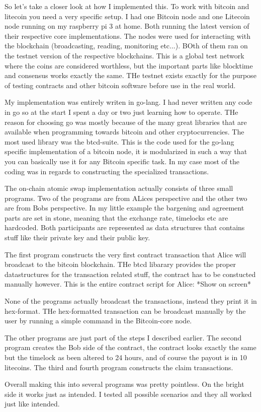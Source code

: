 So let's take a closer look at how I implemented this. To work with bitcoin and litecoin you
need a very specific setup. I had one Bitcoin node and one Litecoin node running on my raspberry pi 3
at home. Both running the latest version of their respective core implementations. The nodes were used 
for interacting with the blockchain (broadcasting, reading, monitoring etc...). 
BOth of them ran on the testnet version of the respective blockchains.
This is a global test network where the coins are considered worthless,
but the important parts like blocktime and consensus works exactly the same.
THe testnet exists exactly for the purpose of testing contracts and other bitcoin software
before use in the real world.

My implementation was entirely writen in go-lang. I had never written any code in go
so at the start I spent a day or two just learning how to operate. THe reason 
for choosing go was mostly because of the many great libraries that are available
when programming towards bitcoin and other cryptocurrencies. The most used
library was the btcd-suite. This is the code used for the go-lang specific implementation
of a bitcoin node, it is modularized in such a way that you can basically use it for any
Bitcoin specific task. In my case most of the coding was in regards to constructing
the specialized transactions. 

The on-chain atomic swap implementation actually consists of three small programs.
Two of the programs are from ALices perspective and the other two are from
Bobs perspective. In my little example the bargening and agreement parts are
set in stone, meaning that the exchange rate, timelocks etc are hardcoded.
Both participants are represented as data structures that contains stuff like
their private key and their public key. 

The first program constructs the very first contract transaction that Alice
will broadcast to the bitcoin blockchain. THe btcd libarary provides the
proper datastructures for the transaction related stuff, the contract has 
to be constucted manually however. This is the entire contract script 
for Alice: *Show on screen*

None of the programs actually broadcast the transactions, instead
they print it in hex-format. THe hex-formatted transaction can be broadcast
manually by the user by running a simple command in the Bitcoin-core node.

The other programs are just part of the steps I described earlier. The second
program creates the Bob side of the contract, the contract looks exactly the same but
the timelock as been altered to 24 hours, and of course the payout is in 10 litecoins.
The third and fourth program constructs the claim transactions. 

Overall making this into several programs was pretty pointless. On the bright
side it works just as intended. I tested all possible scenarios and they
all worked just like intended. 
